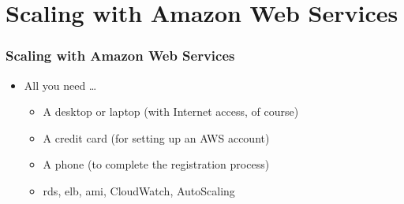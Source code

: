 \documentclass{beamer}
\begin{document}
\section{Scaling with Amazon Web Services}
\begin{frame}[fragile]
\frametitle{Scaling with Amazon Web Services}
\begin{itemize}
 \item All you need \dots
 \begin{itemize}
   \item A desktop or laptop (with Internet access, of course)
   \item A credit card (for setting up an AWS account)
   \item A phone (to complete the registration process)
   \item \acrfull{rds}, \acrfull{elb}, \acrfull{ami}, CloudWatch, AutoScaling 
 \end{itemize}
\end{itemize}

\end{frame}
\end{document}
